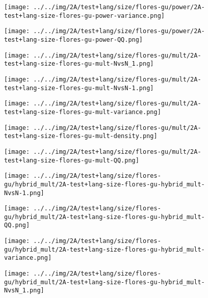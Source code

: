 \begin{figure}[H]
\centering	\texttt{[image: ../../img/2A/test+lang/size/flores-gu/power/2A-test+lang-size-flores-gu-power-variance.png]}
\end{figure}
\begin{figure}[H]
\centering	\texttt{[image: ../../img/2A/test+lang/size/flores-gu/power/2A-test+lang-size-flores-gu-power-QQ.png]}
\end{figure}
\begin{figure}[H]
\centering	\texttt{[image: ../../img/2A/test+lang/size/flores-gu/mult/2A-test+lang-size-flores-gu-mult-NvsN\_1.png]}
\end{figure}
\begin{figure}[H]
\centering	\texttt{[image: ../../img/2A/test+lang/size/flores-gu/mult/2A-test+lang-size-flores-gu-mult-NvsN-1.png]}
\end{figure}
\begin{figure}[H]
\centering	\texttt{[image: ../../img/2A/test+lang/size/flores-gu/mult/2A-test+lang-size-flores-gu-mult-variance.png]}
\end{figure}
\begin{figure}[H]
\centering	\texttt{[image: ../../img/2A/test+lang/size/flores-gu/mult/2A-test+lang-size-flores-gu-mult-density.png]}
\end{figure}
\begin{figure}[H]
\centering	\texttt{[image: ../../img/2A/test+lang/size/flores-gu/mult/2A-test+lang-size-flores-gu-mult-QQ.png]}
\end{figure}
\begin{figure}[H]
\centering	\texttt{[image: ../../img/2A/test+lang/size/flores-gu/hybrid\_mult/2A-test+lang-size-flores-gu-hybrid\_mult-NvsN-1.png]}
\end{figure}
\begin{figure}[H]
\centering	\texttt{[image: ../../img/2A/test+lang/size/flores-gu/hybrid\_mult/2A-test+lang-size-flores-gu-hybrid\_mult-QQ.png]}
\end{figure}
\begin{figure}[H]
\centering	\texttt{[image: ../../img/2A/test+lang/size/flores-gu/hybrid\_mult/2A-test+lang-size-flores-gu-hybrid\_mult-variance.png]}
\end{figure}
\begin{figure}[H]
\centering	\texttt{[image: ../../img/2A/test+lang/size/flores-gu/hybrid\_mult/2A-test+lang-size-flores-gu-hybrid\_mult-NvsN\_1.png]}
\end{figure}
